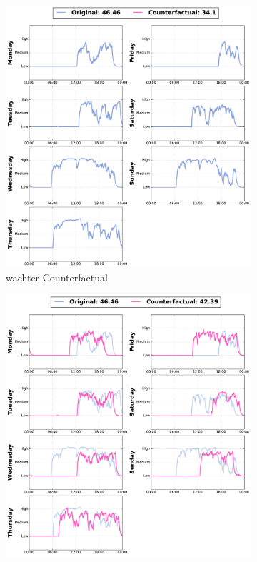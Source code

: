 \begin{figure}[t]
     \centering
     \begin{subfigure}[b]{0.24\textwidth}
         \centering
         \includegraphics[width=\textwidth]{images/6306/0_6306_TCN_Wachter_cf.pdf}
         \caption{\gls{wachter} Counterfactual}
         \label{fig:cf:wachter}
     \end{subfigure}
     \hfill
     \begin{subfigure}[b]{0.24\textwidth}
         \centering
         \includegraphics[width=\textwidth]{images/6306/4_6306_TCN_NUN_cf.pdf}

\end{subfigure}
\end{figure}
